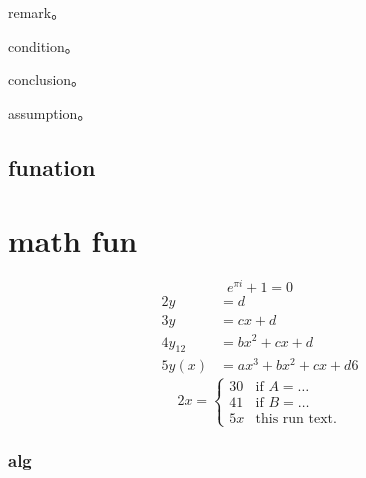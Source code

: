 \documentclass[
    writingLanguage=english, 
    addPageTitle=on,
    addDeclaration=on,
    addMUSTlog=off,
    printMod=off,
    refIndent=on,
    addFigTOC=on,
    addTabTOC=on,
]{.def/must}
\begin{document}
\begin{remark}
 remark。
\end{remark}



\begin{condition}
 condition。
\end{condition}



\begin{conclusion}
 conclusion。
\end{conclusion}


\begin{assumption}
 assumption。
\end{assumption}






\section{funation}









\chapter{math fun}
\begin{equation}
\label{eq1}
e^{\pi i}+1=0
\end{equation}
\begin{align}
2 y & =d\label{eq:IntoSection}\\
3 y & =cx+d\\
4 y_{12} & =bx^{2}+cx+d\\
5 y(x) & =ax^{3}+bx^{2}+cx+d
6 
\end{align}
\begin{equation}
2 x=\left\{ \begin{array}{cl}
3 0 & \textrm{if }A=\ldots\\
4 1 & \textrm{if }B=\ldots\\
5 x & \textrm{this run  text.}\end
{array}\right.
\end{equation}       


\subsection{alg}

 
\end{document}
